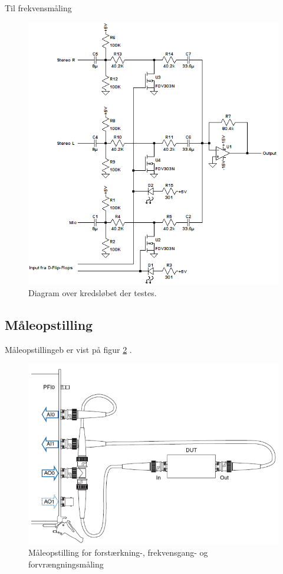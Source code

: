 Til frekvensmåling 
\begin{figure}[h]
\centering
\includegraphics[scale=0.8]{maalerapporter/indgangsvaelger/indgangvaelger_ltspice_diagram.png}
\caption{Diagram over kredsløbet der testes.}
\label{diagram_simulering}
\end{figure}

\subsection*{Måleopstilling}
Måleopstillingeb er vist på figur \ref{fig:indgang:maaleop-thd} .

\begin{figure}[h]
\centering
\includegraphics[scale=0.4]{maalerapporter/indgangsvaelger/maaleopstilling-thd-forforstaerker.png}
\caption{Måleopstilling for forstærkning-, frekvensgang- og forvrængningsmåling}
\label{fig:indgang:maaleop-thd}
\end{figure}


